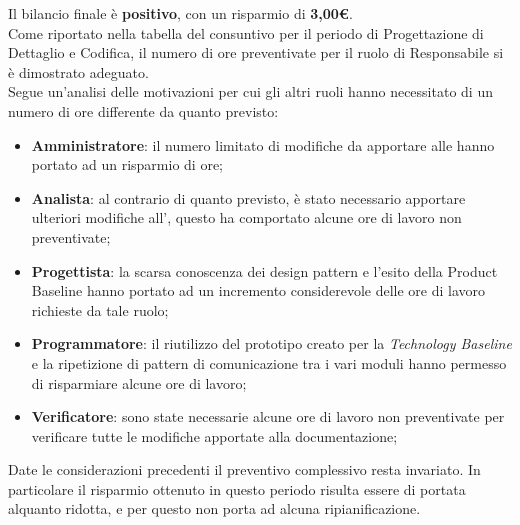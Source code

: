 	Il bilancio finale è \textbf{positivo}, con un risparmio di \textbf{3,00\euro}. \\ Come riportato nella tabella del consuntivo per il periodo di Progettazione di Dettaglio e Codifica, il numero di ore preventivate per il ruolo di Responsabile si è dimostrato adeguato. \\ Segue un'analisi delle motivazioni per cui gli altri ruoli hanno necessitato di un numero di ore differente da quanto previsto: 
	\begin{itemize}
		\item \textbf{Amministratore}: il numero limitato di modifiche da apportare alle \NdP{} hanno portato ad un risparmio di ore;
		\item \textbf{Analista}: al contrario di quanto previsto, è stato necessario apportare ulteriori modifiche all'\AdR, questo ha comportato alcune ore di lavoro non preventivate;
		\item \textbf{Progettista}: la scarsa conoscenza dei design pattern e l'esito della Product Baseline hanno portato ad un incremento considerevole delle ore di lavoro richieste da tale ruolo;
		\item \textbf{Programmatore}: il riutilizzo del prototipo creato per la \textit{Technology Baseline} e la ripetizione di pattern di comunicazione tra i vari moduli hanno permesso di risparmiare alcune ore di lavoro;
		\item \textbf{Verificatore}: sono state necessarie alcune ore di lavoro non preventivate per verificare tutte le modifiche apportate alla documentazione;
	\end{itemize}
	
	Date le considerazioni precedenti il preventivo complessivo resta invariato. In particolare il risparmio ottenuto in questo periodo risulta essere di portata alquanto ridotta, e per questo non porta ad alcuna ripianificazione. 
	
	